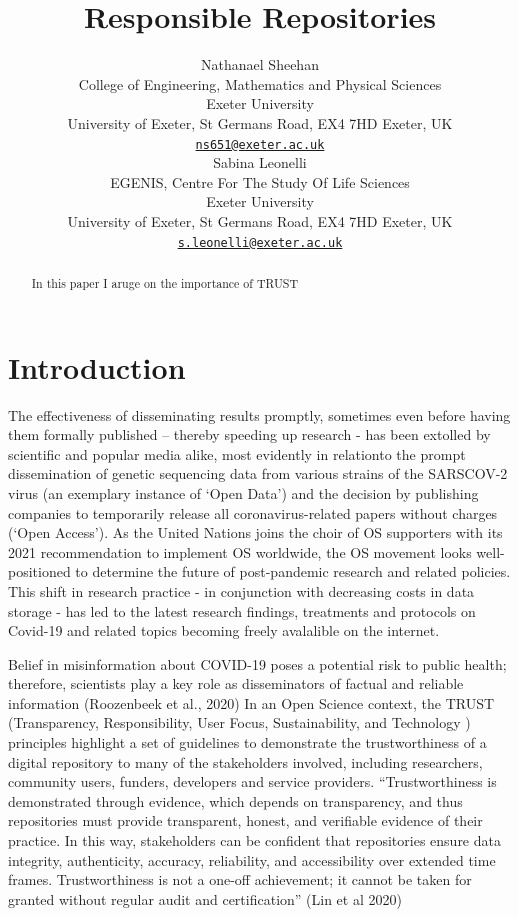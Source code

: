 \documentclass{article}
\title{Responsible Repositories}
\author{
    Nathanael Sheehan
   \\
    College of Engineering, Mathematics and Physical Sciences \\
    Exeter University \\
  University of Exeter, St Germans Road, EX4 7HD Exeter, UK \\
  \texttt{\href{mailto:ns651@exeter.ac.uk}{\nolinkurl{ns651@exeter.ac.uk}}} \\
   \And
    Sabina Leonelli
   \\
    EGENIS, Centre For The Study Of Life Sciences \\
    Exeter University \\
  University of Exeter, St Germans Road, EX4 7HD Exeter, UK \\
  \texttt{\href{mailto:s.leonelli@exeter.ac.uk}{\nolinkurl{s.leonelli@exeter.ac.uk}}} \\
  }
\begin{document}
\maketitle


\begin{abstract}
In this paper I aruge on the importance of TRUST
\end{abstract}


\hypertarget{introduction}{%
\section{Introduction}\label{introduction}}

The effectiveness of disseminating results promptly, sometimes even
before having them formally published -- thereby speeding up research -
has been extolled by scientific and popular media alike, most evidently
in relationto the prompt dissemination of genetic sequencing data from
various strains of the SARSCOV-2 virus (an exemplary instance of `Open
Data') and the decision by publishing companies to temporarily release
all coronavirus-related papers without charges (`Open Access'). As the
United Nations joins the choir of OS supporters with its 2021
recommendation to implement OS worldwide, the OS movement looks
well-positioned to determine the future of post-pandemic research and
related policies. This shift in research practice - in conjunction with
decreasing costs in data storage - has led to the latest research
findings, treatments and protocols on Covid-19 and related topics
becoming freely avalalible on the internet.

Belief in misinformation about COVID-19 poses a potential risk to public
health; therefore, scientists play a key role as disseminators of
factual and reliable information (Roozenbeek et al., 2020) In an Open
Science context, the TRUST (Transparency, Responsibility, User Focus,
Sustainability, and Technology ) principles highlight a set of
guidelines to demonstrate the trustworthiness of a digital repository to
many of the stakeholders involved, including researchers, community
users, funders, developers and service providers. ``Trustworthiness is
demonstrated through evidence, which depends on transparency, and thus
repositories must provide transparent, honest, and verifiable evidence
of their practice. In this way, stakeholders can be confident that
repositories ensure data integrity, authenticity, accuracy, reliability,
and accessibility over extended time frames. Trustworthiness is not a
one-off achievement; it cannot be taken for granted without regular
audit and certification'' (Lin et al 2020)
\end{document}
